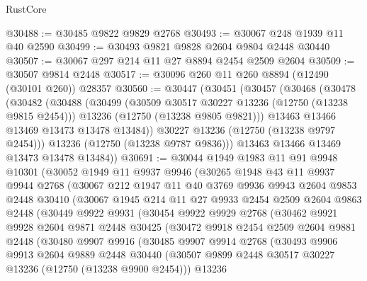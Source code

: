 \begin{lexlean}{RustCore}
\begin{coremodule}
@30488 := @30485 @9822 @9829 @2768
@30493 := @30067 @248 @1939 @11 @40 @2590
@30499 := @30493 @9821 @9828 @2604 @9804 @2448 @30440
@30507 := @30067 @297 @214 @11 @27 @8894 @2454 @2509 @2604
@30509 := @30507 @9814 @2448
@30517 := @30096 @260 @11 @260 @8894 (@12490 (@30101 @260)) @28357
@30560 := @30447
    (@30451
      (@30457
        (@30468
          (@30478
            (@30482
              (@30488
                (@30499
                  (@30509 @30517 @30227 @13236 (@12750 (@13238 @9815 @2454)))
                  @13236
                  (@12750 (@13238 @9805 @9821)))
                @13463
                @13466
                @13469
                @13473
                @13478
                @13484))
            @30227
            @13236
            (@12750 (@13238 @9797 @2454)))
          @13236
          (@12750 (@13238 @9787 @9836)))
        @13463
        @13466
        @13469
        @13473
        @13478
        @13484))
@30691 := @30044
    @1949
    @1983
    @11
    @91
    @9948
    @10301
    (@30052
      @1949
      @11
      @9937
      @9946
      (@30265
        @1948
        @43
        @11
        @9937
        @9944
        @2768
        (@30067
          @212
          @1947
          @11
          @40
          @3769
          @9936
          @9943
          @2604
          @9853
          @2448
          @30410
          (@30067
            @1945
            @214
            @11
            @27
            @9933
            @2454
            @2509
            @2604
            @9863
            @2448
            (@30449
              @9922
              @9931
              (@30454
                @9922
                @9929
                @2768
                (@30462
                  @9921
                  @9928
                  @2604
                  @9871
                  @2448
                  @30425
                  (@30472
                    @9918
                    @2454
                    @2509
                    @2604
                    @9881
                    @2448
                    (@30480
                      @9907
                      @9916
                      (@30485
                        @9907
                        @9914
                        @2768
                        (@30493
                          @9906
                          @9913
                          @2604
                          @9889
                          @2448
                          @30440
                          (@30507 @9899 @2448 @30517 @30227 @13236 (@12750 (@13238 @9900 @2454)))
                          @13236

\end{coremodule}
\end{lexlean}
